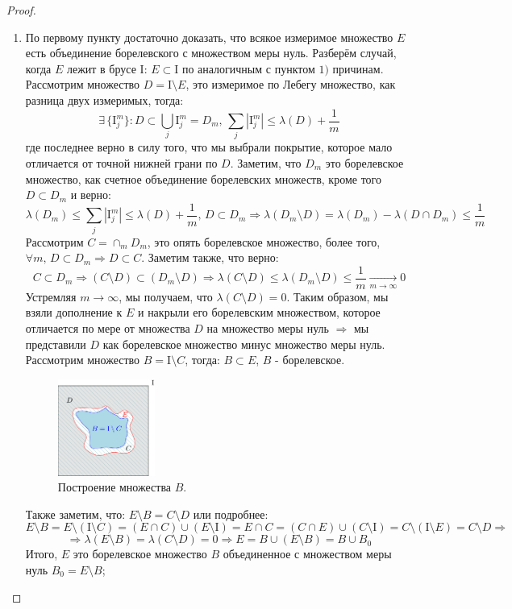 \documentclass[12pt]{article}
\newcommand{\MI}{\mathrm{I}}
\theoremstyle{definition}
\newcommand{\ddsum}[2]{\displaystyle\sum\limits_{#1}^{#2}}
\begin{document}
\begin{proof}
\begin{enumerate}[label=\arabic*)]
		\item По первому пункту достаточно доказать, что всякое измеримое множество $E$ есть объединение борелевского с множеством меры нуль. Разберём случай, когда $E$ лежит в брусе $\MI$: $E \subset \MI$ по аналогичным с пунктом $1)$ причинам. Рассмотрим множество $D = \MI \setminus E$, это измеримое по Лебегу множество, как разница двух измеримых, тогда:
		$$
			\exists \, \{\MI_j^m\} \colon D \subset \bigcup\limits_j \MI_j^m = D_m, \,  \ddsum{j}{}|\MI_j^m| \leq \lambda(D) + \dfrac{1}{m}
		$$
		где последнее верно в силу того, что мы выбрали покрытие, которое мало отличается от точной нижней грани по $D$. Заметим, что  $D_m$ это борелевское множество, как счетное объединение борелевских множеств, кроме того $D \subset D_m$ и верно:
		$$
			\lambda(D_m) \leq \ddsum{j}{}|\MI_j^m| \leq \lambda(D) + \dfrac{1}{m}, \, D \subset D_m \Rightarrow  \lambda(D_m \setminus D) = \lambda(D_m) - \lambda(D \cap D_m)  \leq \dfrac{1}{m}
		$$
		Рассмотрим $C = \cap_m D_m$, это опять борелевское множество, более того, $\forall m, \, D\subset D_m \Rightarrow D \subset C$. Заметим также, что верно:
		$$
			C \subset D_m \Rightarrow (C \setminus D) \subset (D_m \setminus D) \Rightarrow \lambda(C \setminus D) \leq \lambda(D_m \setminus D) \leq \dfrac{1}{m} \xrightarrow[m \to \infty]{} 0
		$$
		Устремляя $m \to \infty$, мы получаем, что $\lambda(C \setminus D) = 0$. Таким образом, мы взяли дополнение к $E$ и накрыли его борелевским множеством, которое отличается по мере от множества $D$ на множество меры нуль $\Rightarrow$ мы представили $D$ как борелевское множество минус множество меры нуль. Рассмотрим множество $B = \MI \setminus C$, тогда: $B \subset E$, $B$ - борелевское.
		\begin{figure}[H]
			\centering
			\includegraphics[width=0.3\textwidth]{MA4L12_1.png}
			\caption{Построение множества $B$.}
			\label{12_1}
		\end{figure}
		Также заметим, что: $E \setminus B = C \setminus D$ или подробнее: 
		$$
			E \setminus B = E \setminus( \MI \setminus C) = (E \cap C) \cup (E \setminus \MI) = E \cap C = (C \cap E) \cup (C \setminus \MI)= C \setminus (\MI \setminus E) = C \setminus D \Rightarrow
		$$
		$$
			\Rightarrow \lambda(E \setminus B) = \lambda(C \setminus D ) = 0 \Rightarrow E = B \cup (E \setminus B) = B \cup B_0
		$$
		Итого, $E$ это борелевское множество $B$ объединенное с множеством меры нуль $B_0 = E\setminus B$;
	\end{enumerate}
\end{proof}
\end{document}
